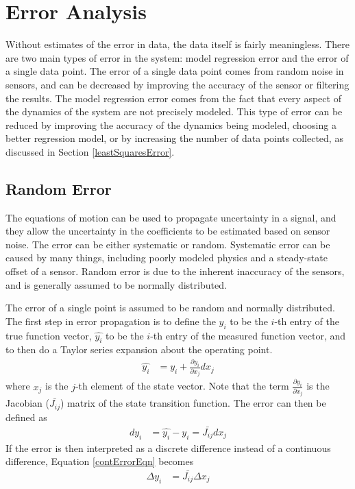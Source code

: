 \section{Error Analysis}
Without estimates of the error in data, the data itself is fairly meaningless. There are two main types of error in the system: model regression error and the error of a single data point. The error of a single data point comes from random noise in sensors, and can be decreased by improving the accuracy of the sensor or filtering the results. The model regression error comes from the fact that every aspect of the dynamics of the system are not precisely modeled. This type of error can be reduced by improving the accuracy of the dynamics being modeled, choosing a better regression model, or by increasing the number of data points collected, as discussed in Section \ref{leastSquaresError}.
\subsection*{Random Error}
\label{pointErrorSection}
 The equations of motion can be used to propagate uncertainty in a signal, and they allow the uncertainty in the coefficients to be estimated based on sensor noise. The error can be either systematic or random. Systematic error can be caused by many things, including poorly modeled physics and a steady-state offset of a sensor. Random error is due to the inherent inaccuracy of the sensors, and is generally assumed to be normally distributed.

The error of a single point is assumed to be random and normally distributed. The first step in error propagation is to define the $y_i$ to be the $i$-th entry of the true function vector, $\hat{y_i}$ to be the $i$-th entry of the measured function vector, and to then do a Taylor series expansion about the operating point.
\begin{align}
\hat{y_i} &= y_i + \frac{\partial{y_i}}{\partial{x_j}}dx_j
\end{align}
where $x_j$ is the $j$-th element of the state vector. Note that the term $\frac{\partial{y_i}}{\partial{x_j}}$ is the Jacobian ($\bar{J_{ij}}$) matrix of the state transition function. The error can then be defined as
\begin{align}
\label{contErrorEqn}
dy_i &= \hat{y_i}-y_i =  \bar{J_{ij}}dx_j
\end{align}
If the error is then interpreted as a discrete difference instead of a continuous difference, Equation \ref{contErrorEqn} becomes
\begin{align}
\label{errorEqn}
\Delta y_i &= \bar{J_{ij}}\Delta x_j
\end{align}

